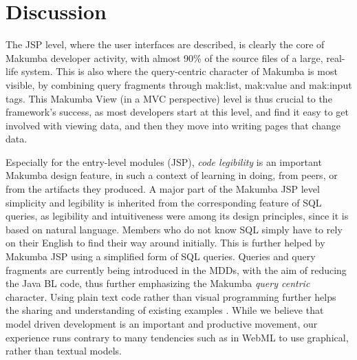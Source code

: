\documentclass{chi2009}
\begin{document}
%

\section{Discussion}\label{sec:disco}
The JSP level, where the user interfaces are described, is clearly the core of Makumba developer activity, with almost 90\% of the source files of a large, real-life system. This is also where the query-centric character of Makumba is most visible, by combining query fragments through mak:list, mak:value and mak:input tags. This Makumba View (in a MVC perspective) level is thus crucial to the framework's success, as most developers start at this level, and find it easy to get involved with viewing data, and then they move into writing pages that change data. 


Especially for the entry-level modules (JSP), \textit{code legibility} is an important Makumba design feature, in such a context of learning in doing, from peers, or from the artifacts they produced. 
A major part of the Makumba JSP level simplicity and legibility is inherited from the corresponding feature of SQL queries, as legibility and intuitiveness were among its design principles, since it is based on natural language. Members who do not know SQL simply have to rely on their English to find their way around initially. This is further helped by Makumba JSP using a simplified form of SQL queries. Queries and query fragments are currently being introduced in the MDDs, with the aim of reducing the Java BL code, thus further emphasizing the Makumba \textit{query centric} character. Using plain text code rather than visual programming further helps the sharing and understanding of existing examples \cite{yamauchi00}. While we believe that model driven development is an important and productive movement, our experience runs contrary to many tendencies such as in WebML \cite{Ceri00webmodeling} to use graphical, rather than textual models.
\end{document}
